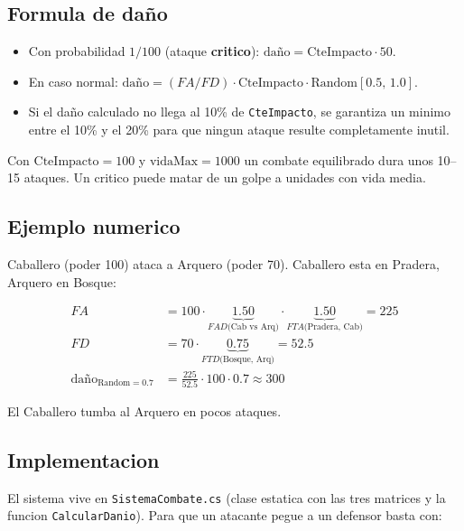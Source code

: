\documentclass[12pt,a4paper]{article}
\begin{document}
\subsection{Formula de daño}

\begin{formulabox}
\begin{itemize}[leftmargin=1.5em]
    \item Con probabilidad $1/100$ (ataque \textbf{critico}): $\text{daño} = \text{CteImpacto} \cdot 50$.
    \item En caso normal: $\text{daño} = (FA/FD) \cdot \text{CteImpacto} \cdot \text{Random}[0.5,\, 1.0]$.
    \item Si el daño calculado no llega al 10\% de \texttt{CteImpacto}, se garantiza un minimo entre el 10\% y el 20\% para que ningun ataque resulte completamente inutil.
\end{itemize}
\end{formulabox}

Con $\text{CteImpacto} = 100$ y $\text{vidaMax} = 1000$ un combate
equilibrado dura unos 10–15 ataques. Un critico puede matar de un golpe
a unidades con vida media.

\subsection{Ejemplo numerico}

Caballero (poder 100) ataca a Arquero (poder 70). Caballero esta en
Pradera, Arquero en Bosque:

\begin{align*}
FA &= 100 \cdot \underbrace{1.50}_{FAD\text{(Cab vs Arq)}} \cdot \underbrace{1.50}_{FTA\text{(Pradera, Cab)}} = 225 \\
FD &= 70 \cdot \underbrace{0.75}_{FTD\text{(Bosque, Arq)}} = 52.5 \\
\text{daño}_{\text{Random}=0.7} &= \tfrac{225}{52.5} \cdot 100 \cdot 0.7 \approx 300
\end{align*}

El Caballero tumba al Arquero en pocos ataques.

\subsection{Implementacion}

El sistema vive en \texttt{SistemaCombate.cs} (clase estatica con las
tres matrices y la funcion \texttt{CalcularDanio}). Para que un
atacante pegue a un defensor basta con:
\end{document}
